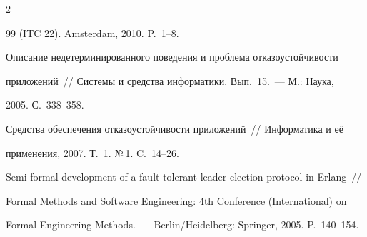 \begin{multicols}{2}
{{\begin{thebibliography}{99}
(ITC 22). Amsterdam, 2010. P.~1--8.









Описание недетерминированного поведения и проблема отказоустойчивости 


приложений~// Системы и средства информатики. Вып.~15.~--- М.: Наука, 


2005. С.~338--358.









Средства обеспечения отказоустойчивости приложений~// Информатика и её 


применения, 2007. Т.~1. №\,1. C.~14--26.








 \label{end\stat}


 






Semi-formal development of a fault-tolerant leader election protocol in Erlang~// 


Formal Methods and Software Engineering: 4th Conference (International) on 


Formal Engineering Methods.~--- Berlin/Heidelberg: Springer, 2005. P.~140--154.


 


 \end{thebibliography}


}


}








\end{multicols}        





      


